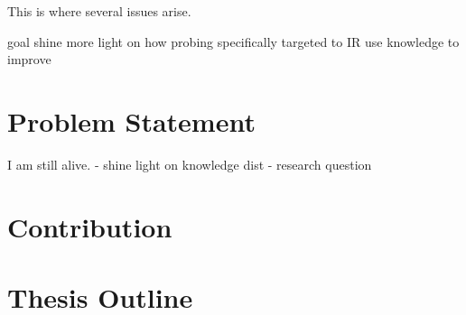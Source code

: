 This is where several issues arise.

goal
shine more light on how
probing specifically targeted to IR
use knowledge to improve



\section{Problem Statement}
I am still alive.
- shine light on knowledge dist
- research question
\section{Contribution}

\section{Thesis Outline}
